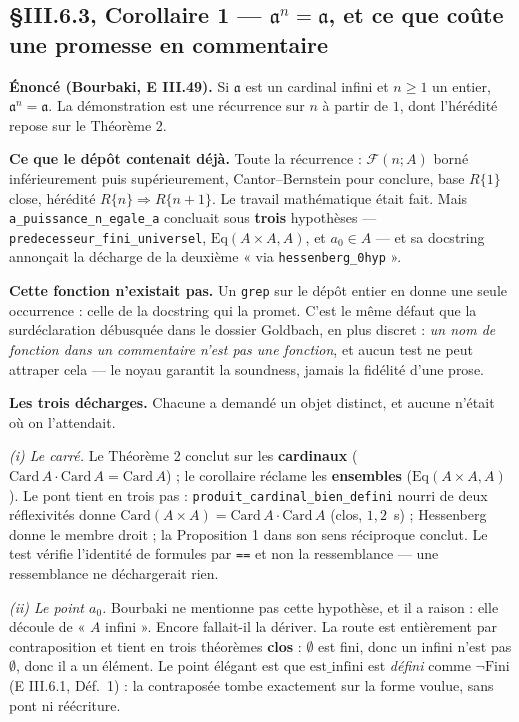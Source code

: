 \subsection{§III.6.3, Corollaire 1 --- $\mathfrak{a}^n = \mathfrak{a}$, et ce que
coûte une promesse en commentaire}
\label{sec:iii6-cor1}

\textbf{Énoncé (Bourbaki, E III.49).} Si $\mathfrak{a}$ est un cardinal infini et
$n \ge 1$ un entier, $\mathfrak{a}^n = \mathfrak{a}$. La démonstration est une
récurrence sur $n$ à partir de $1$, dont l'hérédité repose sur le Théorème 2.

\textbf{Ce que le dépôt contenait déjà.} Toute la récurrence :
$\mathcal{F}(n;A)$ borné inférieurement puis supérieurement, Cantor--Bernstein
pour conclure, base $R\{1\}$ close, hérédité $R\{n\} \Rightarrow R\{n+1\}$.
Le travail mathématique était fait. Mais \texttt{a\_puissance\_n\_egale\_a}
concluait sous \textbf{trois} hypothèses --- \texttt{predecesseur\_fini\_universel},
$\mathrm{Eq}(A\times A, A)$, et $a_0 \in A$ --- et sa docstring annonçait la
décharge de la deuxième « via \texttt{hessenberg\_0hyp} ».

\textbf{Cette fonction n'existait pas.} Un \texttt{grep} sur le dépôt entier en
donne une seule occurrence : celle de la docstring qui la promet. C'est le même
défaut que la surdéclaration débusquée dans le dossier Goldbach, en plus
discret : \emph{un nom de fonction dans un commentaire n'est pas une fonction},
et aucun test ne peut attraper cela --- le noyau garantit la soundness, jamais
la fidélité d'une prose.

\textbf{Les trois décharges.} Chacune a demandé un objet distinct, et aucune
n'était où on l'attendait.

\emph{(i) Le carré.} Le Théorème 2 conclut sur les \textbf{cardinaux}
($\mathrm{Card}\,A \cdot \mathrm{Card}\,A = \mathrm{Card}\,A$) ; le corollaire
réclame les \textbf{ensembles} ($\mathrm{Eq}(A\times A, A)$). Le pont tient en
trois pas : \texttt{produit\_cardinal\_bien\_defini} nourri de deux réflexivités
donne $\mathrm{Card}(A\times A) = \mathrm{Card}\,A \cdot \mathrm{Card}\,A$
(clos, $1{,}2$~s) ; Hessenberg donne le membre droit ; la Proposition 1 dans son
sens réciproque conclut. Le test vérifie l'identité de formules par
\texttt{==} et non la ressemblance --- une ressemblance ne déchargerait rien.

\emph{(ii) Le point $a_0$.} Bourbaki ne mentionne pas cette hypothèse, et il a
raison : elle découle de « $A$ infini ». Encore fallait-il la dériver. La route
est entièrement par contraposition et tient en trois théorèmes \textbf{clos} :
$\emptyset$ est fini, donc un infini n'est pas $\emptyset$, donc il a un élément.
Le point élégant est que $\mathrm{est\_infini}$ est \emph{défini} comme
$\neg\mathrm{Fini}$ (E III.6.1, Déf.~1) : la contraposée tombe exactement sur la
forme voulue, sans pont ni réécriture.

